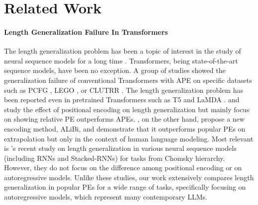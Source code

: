 \documentclass{article}
\begin{document}
\section{Related Work}
\paragraph{Length Generalization Failure In Transformers}
The length generalization problem has been a topic of interest in the study of neural sequence models for a long time \citep{Graves2014:NTM,Kaiser2015:NeuralGPU,Lake2018:SCAN,Hupkes2020:Compositionality,Yehudai2020:GraphSizeGen}.
Transformers, being state-of-the-art sequence models, have been no exception.
A group of studies showed the generalization failure of conventional Transformers with APE on specific datasets such as
PCFG \citep{Hupkes2020:Compositionality}, LEGO \citep{Zhang2023:LEGO}, or CLUTRR \citep{Sinha2019:CLUTRR,Gontier2020:GPTCLUTRR}.
The length generalization problem has been reported even in pretrained Transformers such as T5 \citep{Furrer2020:CompGenSM} and LaMDA \citep{Anil2022:LengthFailure}.
\citet{Csordas2021:DevilInDetail} and \citet{Ontanon2022:MakeTransformerCompositional} study the effect of positional encoding on length generalization but mainly focus on showing relative PE outperforms APEs. \citet{Press2022:ALiBi}, on the other hand, propose a new encoding method, ALiBi, and demonstrate that it outperforms popular PEs on extrapolation but only in the context of human language modeling.
Most relevant is \citet{Deletang2023:Chomskey}'s recent study on length generalization in various neural sequence models (including RNNs and Stacked-RNNs) for tasks from Chomsky hierarchy. However, they do not focus on the difference among positional encoding or on autoregressive models. Unlike these studies, our work extensively compares length generalization in popular PEs for a wide range of tasks, specifically focusing on autoregressive models, which represent many contemporary LLMs.
\end{document}

